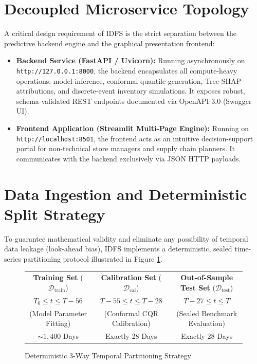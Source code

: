 \documentclass[12pt,a4paper,oneside]{report}
\theoremstyle{definition}
\begin{document}
\section{Decoupled Microservice Topology}
A critical design requirement of IDFS is the strict separation between the predictive backend engine and the graphical presentation frontend:
\begin{itemize}[itemsep=0.2cm]
    \item \textbf{Backend Service (FastAPI / Uvicorn):} Running asynchronously on \texttt{http://127.0.0.1:8000}, the backend encapsulates all compute-heavy operations: model inference, conformal quantile generation, Tree-SHAP attributions, and discrete-event inventory simulations. It exposes robust, schema-validated REST endpoints documented via OpenAPI 3.0 (Swagger UI).
    \item \textbf{Frontend Application (Streamlit Multi-Page Engine):} Running on \texttt{http://localhost:8501}, the frontend acts as an intuitive decision-support portal for non-technical store managers and supply chain planners. It communicates with the backend exclusively via JSON HTTP payloads.
\end{itemize}

\section{Data Ingestion and Deterministic Split Strategy}
To guarantee mathematical validity and eliminate any possibility of temporal data leakage (look-ahead bias), IDFS implements a deterministic, sealed time-series partitioning protocol illustrated in Figure \ref{fig:data_split}.

\begin{figure}[H]
\centering
\begin{tcolorbox}[colback=gray!5!white,colframe=gray!75!black,title=\textbf{Temporal Partitioning Protocol}]
\centering
\begin{tabular}{|c|c|c|}
\hline
\textbf{Training Set} ($\mathcal{D}_{\text{train}}$) & \textbf{Calibration Set} ($\mathcal{D}_{\text{cal}}$) & \textbf{Out-of-Sample Test Set} ($\mathcal{D}_{\text{test}}$) \\
$T_0 \le t \le T - 56$ & $T - 55 \le t \le T - 28$ & $T - 27 \le t \le T$ \\
(Model Parameter Fitting) & (Conformal CQR Calibration) & (Sealed Benchmark Evaluation) \\
$\sim 1,400$ Days & Exactly 28 Days & Exactly 28 Days \\
\hline
\end{tabular}
\end{tcolorbox}
\caption{Deterministic 3-Way Temporal Partitioning Strategy}
\label{fig:data_split}
\end{figure}
\end{document}
